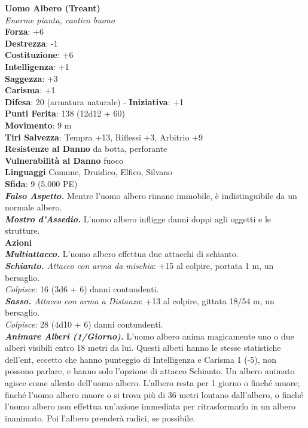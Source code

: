 \begin{multicols}{2}
\medskip\textbf{Uomo Albero (Treant)}\\
\emph{Enorme pianta, caotico buono}\\
\textbf{Forza}: +6\\
\textbf{Destrezza}: -1\\
\textbf{Costituzione}: +6\\
\textbf{Intelligenza}: +1\\
\textbf{Saggezza}: +3\\
\textbf{Carisma}: +1\\
\textbf{Difesa}: 20 (armatura naturale) - \textbf{Iniziativa}: +1\\
\textbf{Punti Ferita}: 138 (12d12 + 60)\\
\textbf{Movimento}: 9 m\\
\textbf{Tiri Salvezza}: Tempra +13, Riflessi +3, Arbitrio +9\\
\textbf{Resistenze al Danno} da botta, perforante\\
\textbf{Vulnerabilità al Danno} fuoco\\
\textbf{Linguaggi} Comune, Druidico, Elfico, Silvano\\
\textbf{Sfida}: 9 (5.000 PE)\smallskip\\
\emph{\textbf{Falso Aspetto.}} Mentre l'uomo albero rimane immobile, è indistinguibile da un normale albero.\\
\emph{\textbf{Mostro d'Assedio.}} L'uomo albero infligge danni doppi agli oggetti e le strutture.\\
\smallskip\textbf{Azioni}\\
\emph{\textbf{Multiattacco.}} L'uomo albero effettua due attacchi di schianto.\\
\emph{\textbf{Schianto.} Attacco con arma da mischia}: +15 al colpire, portata 1 m, un bersaglio.\\
\emph{Colpisce:} 16 (3d6 + 6) danni contundenti.\\
\emph{\textbf{Sasso.} Attacco con arma a Distanza}: +13 al colpire, gittata 18/54 m, un bersaglio.\\
\emph{Colpisce:} 28 (4d10 + 6) danni contundenti.\\
\emph{\textbf{Animare Alberi (1/Giorno).}} L'uomo albero anima magicamente uno o due alberi visibili entro 18 metri da lui. Questi albeti hanno le stesse statistiche dell'ent, eccetto che hanno punteggio di Intelligenza e Carisma 1 (-5), non possono parlare, e hanno solo l'opzione di attacco Schianto. Un albero animato agisce come alleato dell'uomo albero. L'albero resta per 1 giorno o finché muore; finché l'uomo albero muore o si trova più di 36 metri lontano dall'albero, o finché l'uomo albero non effettua un'azione immediata per ritrasformarlo in un albero inanimato. Poi l'albero prenderà radici, se possibile. \\

\end{multicols}
